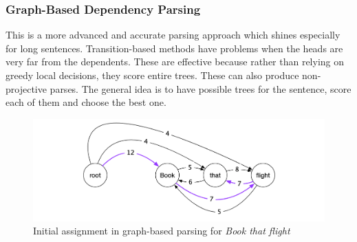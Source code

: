 \subsubsection*{Graph-Based Dependency Parsing}
This is a more advanced and accurate parsing approach which shines especially
for long sentences. Transition-based methods have problems when the heads are
very far from the dependents. These are effective because rather than relying on
greedy local decisions, they score entire trees. These can also produce
non-projective parses. The general idea is to have possible trees for the
sentence, score each of them and choose the best one.
\begin{figure}[!h]
    \center
    \includegraphics[scale=0.2]{images/graph-based-parser}
    \caption{Initial assignment in graph-based parsing for \textit{Book that flight}\cite{stanfordLec}}
    \label{fig:transition_based_parser}
\end{figure}

